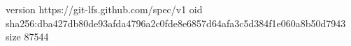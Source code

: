 version https://git-lfs.github.com/spec/v1
oid sha256:dba427db80de93afda4796a2c0fde8e6857d64afa3c5d384f1e060a8b50d7943
size 87544
